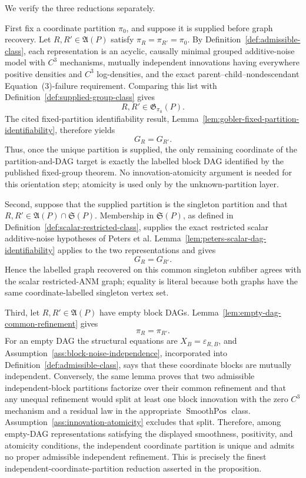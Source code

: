We verify the three reductions separately.

First fix a coordinate partition \(\pi_0\), and suppose it is supplied before graph recovery.  Let \(R,R'\in\mathfrak A(P)\) satisfy \(\pi_R=\pi_{R'}=\pi_0\).  By Definition~\ref{def:admissible-class}, each representation is an acyclic, causally minimal grouped additive-noise model with \(C^3\) mechanisms, mutually independent innovations having everywhere positive densities and \(C^3\) log-densities, and the exact parent--child--nondescendant Equation~(3)-failure requirement.  Comparing this list with Definition~\ref{def:supplied-group-class} gives
\[
 R,R'\in\mathfrak G_{\pi_0}(P).
\]
The cited fixed-partition identifiability result, Lemma~\ref{lem:gobler-fixed-partition-identifiability}, therefore yields
\[
 G_R=G_{R'}.
\]
Thus, once the unique partition is supplied, the only remaining coordinate of the partition-and-DAG target is exactly the labelled block DAG identified by the published fixed-group theorem.  No innovation-atomicity argument is needed for this orientation step; atomicity is used only by the unknown-partition layer.

Second, suppose that the supplied partition is the singleton partition and that \(R,R'\in\mathfrak A(P)\cap\mathfrak S(P)\).  Membership in \(\mathfrak S(P)\), as defined in Definition~\ref{def:scalar-restricted-class}, supplies the exact restricted scalar additive-noise hypotheses of Peters et al.  Lemma~\ref{lem:peters-scalar-dag-identifiability} applies to the two representations and gives
\[
 G_R=G_{R'}.
\]
Hence the labelled graph recovered on this common singleton subfiber agrees with the scalar restricted-ANM graph; equality is literal because both graphs have the same coordinate-labelled singleton vertex set.

Third, let \(R,R'\in\mathfrak A(P)\) have empty block DAGs.  Lemma~\ref{lem:empty-dag-common-refinement} gives
\[
 \pi_R=\pi_{R'}.
\]
For an empty DAG the structural equations are \(X_B=\varepsilon_{R,B}\), and Assumption~\ref{ass:block-noise-independence}, incorporated into Definition~\ref{def:admissible-class}, says that these coordinate blocks are mutually independent.  Conversely, the same lemma proves that two admissible independent-block partitions factorize over their common refinement and that any unequal refinement would split at least one block innovation with the zero \(C^3\) mechanism and a residual law in the appropriate \(\operatorname{SmoothPos}\) class.  Assumption~\ref{ass:innovation-atomicity} excludes that split.  Therefore, among empty-DAG representations satisfying the displayed smoothness, positivity, and atomicity conditions, the independent coordinate partition is unique and admits no proper admissible independent refinement.  This is precisely the finest independent-coordinate-partition reduction asserted in the proposition.